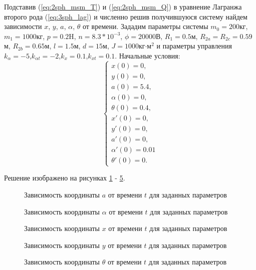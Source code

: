 Подставив (\ref{eq:2sph_msm_T}) и (\ref{eq:2sph_msm_Q}) в уравнение Лагранжа второго рода (\ref{eq:3sph_lag}) и численно решив получившуюся систему найдем зависимости $x$, $y$, $a$, $\alpha$, $\theta$ от времени.
Зададим параметры системы $m_0 = 200$кг, $m_1=1000$кг, $p=0.2$H, $n=8.3 * 10^{-3}$, $\phi = 20000$В, $R_1 = 0.5$м, $R_{2a} = R_{2c} = 0.59$м, $R_{2b} = 0.65$м, $l = 1.5$м, $d = 15$м, $J = 1000$кг$\cdot$м${}^2$ и параметры управления $k_\alpha = -5$,$k_{\alpha t} = -2$,$k_x = 0.1$,$k_{x t} = 0.1$.
Начальные условия:
\begin{equation}
	\begin{cases}
		x(0) = 0, \\
		y(0) = 0, \\
		a(0) = 5.4, \\
		\alpha(0) = 0,\\
		\theta(0) = 0.4,\\
		x'(0) = 0, \\
		y'(0) = 0, \\
		a'(0) = 0, \\
		\alpha'(0) = 0.01\\
		\theta'(0) = 0.
	\end{cases}
\end{equation}

Решение изображено на рисунках \ref{ris:2sph_msm_a_no_u} - \ref{ris:2sph_msm_theta_no_u}.

\begin{figure}[H]
	\caption{Зависимость координаты $a$ от времени $t$ для заданных параметров}
	\label{ris:2sph_msm_a_no_u}
\end{figure}
\begin{figure}[H]
	\caption{Зависимость координаты $\alpha$ от времени $t$ для заданных параметров}
	\label{ris:2sph_msm_alpha_no_u}
\end{figure} 
\begin{figure}[H]
	\caption{Зависимость координаты $x$ от времени $t$ для заданных параметров}
	\label{ris:2sph_msm_x_no_u}
\end{figure} 
\begin{figure}[H]
	\caption{Зависимость координаты $y$ от времени $t$ для заданных параметров}
	\label{ris:2sph_msm_y_no_u}
\end{figure} 
\begin{figure}[H]
	\caption{Зависимость координаты $\theta$ от времени $t$ для заданных параметров}
	\label{ris:2sph_msm_theta_no_u}
\end{figure}


